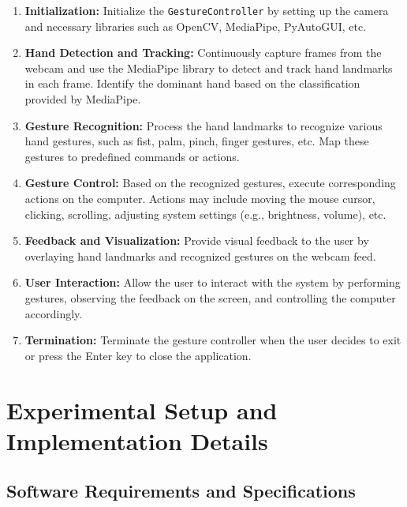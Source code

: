 \documentclass[12pt,a4paper]{report}
\begin{document}
\begin{enumerate}
  \item \textbf{Initialization:} Initialize the \texttt{GestureController} by setting up the
    camera and necessary libraries such as OpenCV, MediaPipe, PyAutoGUI, etc.

  \item \textbf{Hand Detection and Tracking:} Continuously capture frames from the webcam and
    use the MediaPipe library to detect and track hand landmarks in each frame. Identify the
    dominant hand based on the classification provided by MediaPipe.

  \item \textbf{Gesture Recognition:} Process the hand landmarks to recognize various hand
    gestures, such as fist, palm, pinch, finger gestures, etc. Map these gestures to
    predefined commands or actions.

  \item \textbf{Gesture Control:} Based on the recognized gestures, execute corresponding
    actions on the computer. Actions may include moving the mouse cursor, clicking, scrolling,
    adjusting system settings (e.g., brightness, volume), etc.

  \item \textbf{Feedback and Visualization:} Provide visual feedback to the user by overlaying
    hand landmarks and recognized gestures on the webcam feed.

  \item \textbf{User Interaction:} Allow the user to interact with the system by performing
    gestures, observing the feedback on the screen, and controlling the computer accordingly.

  \item \textbf{Termination:} Terminate the gesture controller when the user decides to exit
    or press the Enter key to close the application.
\end{enumerate}

\chapter{Experimental Setup and Implementation Details}

\section{Software Requirements and Specifications}
\end{document}
